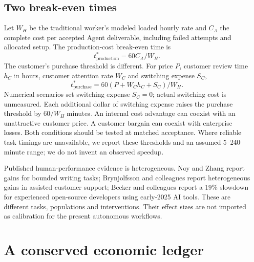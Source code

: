 \documentclass[11pt,a4paper]{article}
\begin{document}
\subsection{Two break-even times}
Let $W_H$ be the traditional worker's modeled loaded hourly rate and $C_A$ the complete cost per accepted Agent deliverable, including failed attempts and allocated setup. The production-cost break-even time is
\begin{equation} t^*_{\mathrm{production}}=60C_A/W_H. \end{equation}
The customer's purchase threshold is different. For price $P$, customer review time $h_C$ in hours, customer attention rate $W_C$ and switching expense $S_C$,
\begin{equation} t^*_{\mathrm{purchase}}=60(P+W_Ch_C+S_C)/W_H. \end{equation}
Numerical scenarios set switching expense $S_C=0$; actual switching cost is unmeasured. Each additional dollar of switching expense raises the purchase threshold by $60/W_H$ minutes. An internal cost advantage can coexist with an unattractive customer price. A customer bargain can coexist with enterprise losses. Both conditions should be tested at matched acceptance. Where reliable task timings are unavailable, we report these thresholds and an assumed 5--240 minute range; we do not invent an observed speedup.

Published human-performance evidence is heterogeneous. Noy and Zhang report gains for bounded writing tasks; Brynjolfsson and colleagues report heterogeneous gains in assisted customer support; Becker and colleagues report a 19\% slowdown for experienced open-source developers using early-2025 AI tools. These are different tasks, populations and interventions. Their effect sizes are not imported as calibration for the present autonomous workflows.\citep{noyzhang2023,brynjolfsson2024,becker2025}

\section{A conserved economic ledger}
\label{sec:ledger}
\end{document}
